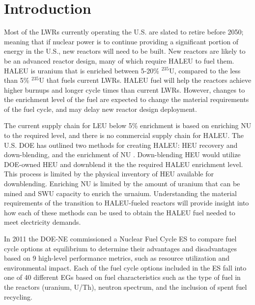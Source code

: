 \section{Introduction}

Most of the \glspl{LWR} currently operating the U.S. are slated to retire
before 2050; meaning that if nuclear power is to continue providing a 
significant portion of energy in the U.S., new reactors will need to be built. 
New reactors are likely to be an advanced reactor design, many of 
which require \gls{HALEU} to fuel them. \gls{HALEU} is uranium that 
is enriched between 5-20\% $^{235}$U, compared to the less than 5\% $^{235}$U 
that fuels current \glspl{LWR}. \gls{HALEU} fuel will help 
the reactors achieve higher burnups and longer cycle times than current 
\glspl{LWR}. However, changes to the enrichment level of the fuel are 
expected 
to change the material requirements of the fuel cycle, and may delay 
new reactor design deployment.

The current supply chain for \gls{LEU} below 5\% enrichment is based on 
enriching \gls{NU} to the required level, and there is no commercial 
supply chain for \gls{HALEU}. The U.S. \gls{DOE} has outlined 
two methods for creating \gls{HALEU}: \gls{HEU} recovery and down-blending, 
and the enrichment of \gls{NU} \cite{griffith_overview_2020}. 
Down-blending \gls{HEU} would utilize \gls{DOE}-owned \gls{HEU} and 
downblend it the the required \gls{HALEU} enrichment level. This 
process is 
limited by the physical inventory of \gls{HEU} available for downblending. 
Enriching \gls{NU} is limited by the amount of uranium that can be 
mined and \gls{SWU} capacity to enrich the urnaium. Understanding the 
material requirements of the transition to \gls{HALEU}-fueled 
reactors will provide insight into how each of these methods can be used 
to obtain the \gls{HALEU} fuel needed to meet electricity demands.

In 2011 the \gls{DOE-NE} commissioned a Nuclear Fuel Cycle \gls{ES} 
\cite{wigeland_nuclear_2014} to compare fuel cycle options at equilibrium
to determine their advantages and disadvantages
based on 9 high-level performance metrics, such as resource utilization and 
environmental impact. Each of the fuel cycle options included in the 
\gls{ES} fall into one of 40 different \glspl{EG} based on fuel 
characteristics such as the type of fuel in the reactors (uranium, 
U/Th), neutron spectrum, and the inclusion of spent fuel recycling. 

